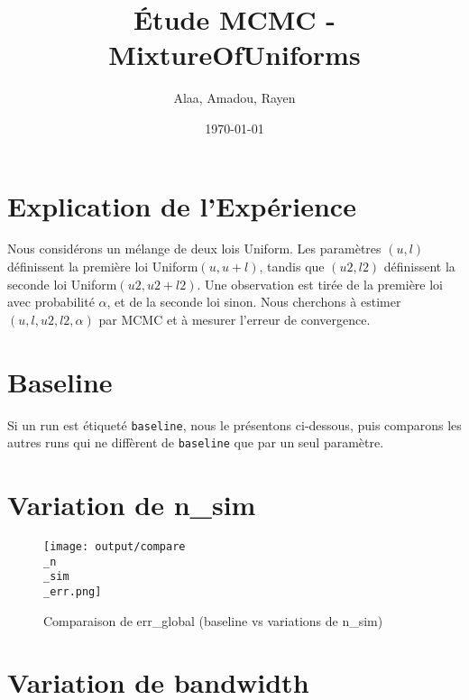 \documentclass[11pt,a4paper]{article}
\title{Étude MCMC - MixtureOfUniforms}
\author{Alaa, Amadou, Rayen}
\date{\today}
\begin{document}
\maketitle

\section{Explication de l'Expérience}
Nous considérons un mélange de deux lois Uniform. Les paramètres $(u,l)$ 
définissent la première loi Uniform$(u,u+l)$, tandis que $(u2,l2)$ définissent 
la seconde loi Uniform$(u2,u2+l2)$. Une observation est tirée de la première loi 
avec probabilité $\alpha$, et de la seconde loi sinon. Nous cherchons à estimer 
$(u,l,u2,l2,\alpha)$ par MCMC et à mesurer l'erreur de convergence.

\section{Baseline}
Si un run est étiqueté \texttt{baseline}, nous le présentons ci-dessous, puis 
comparons les autres runs qui ne diffèrent de \texttt{baseline} que par un seul 
paramètre.



\section*{Variation de n\_sim}





\begin{figure}[H]

  \centering

  \texttt{[image: output/compare\\\_n\\\_sim\\\_err.png]}

  \caption{Comparaison de err\_global (baseline vs variations de n\_sim)}

\end{figure}


\section*{Variation de bandwidth}






\end{document}
